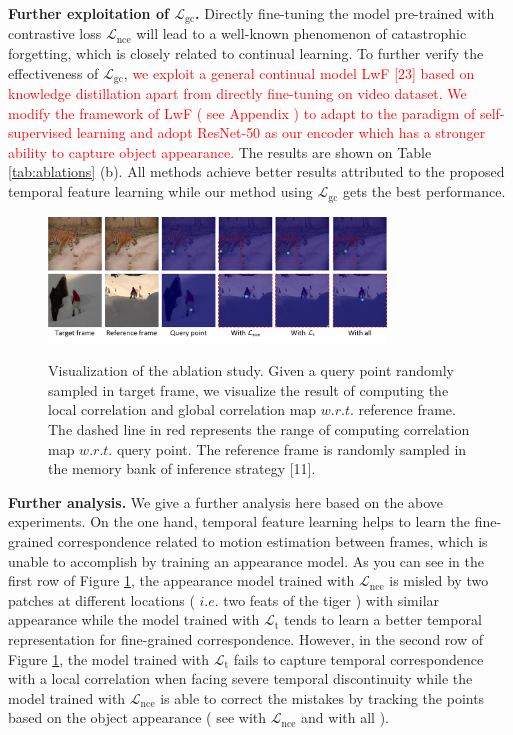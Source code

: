 \documentclass{article}
\begin{document}
\textbf{Further exploitation of $\mathcal{L}_{\mathrm{gc}}$.}  Directly fine-tuning the model pre-trained with contrastive loss $\mathcal{L}_{\mathrm{nce}}$ will lead to a well-known phenomenon of catastrophic forgetting, which is closely related to continual learning. To further verify the effectiveness of  $\mathcal{L}_{\mathrm{gc}}$,  \textcolor{red}{we exploit a general continual model LwF [23]  based on knowledge distillation apart from directly fine-tuning on video dataset. We modify the framework of LwF ( see Appendix ) to adapt to the paradigm of self-supervised learning and adopt ResNet-50 as our encoder which has a stronger ability to capture object appearance.} The results are shown on Table \ref{tab:ablations} (b). All methods achieve better results attributed to the proposed temporal feature learning while our method using $\mathcal{L}_{\mathrm{gc}}$ gets the best performance. 

\begin{figure}[!tb]
  \centering
  {\includegraphics[width=0.8\textwidth]{figure/abalations/ablataions.pdf}}
  \caption{\small Visualization of the ablation study. Given a query point randomly sampled in target frame, we visualize the result of computing the local correlation and global correlation map $w.r.t.$ reference frame. The dashed line in red represents the range of computing correlation map $w.r.t.$ query point. The reference frame is randomly sampled in the memory bank of inference strategy [11]. }
  \label{fig:ablations}
  \vspace{-7mm}
\end{figure}


\textbf{Further analysis.} 
We give a further analysis here based on the above experiments. On the one hand, temporal feature learning helps to learn the fine-grained correspondence related to motion estimation between frames, which is unable to accomplish by training an appearance model. As you can see in the first row of Figure \ref{fig:ablations}, the appearance model trained with $\mathcal{L}_{\mathrm{nce}}$ is misled by two patches at different locations ( $i.e.$ two feats of the tiger ) with similar appearance while the model trained with $\mathcal{L}_{\mathrm{t}}$ tends to learn a better temporal representation for fine-grained correspondence. However, in the second row of Figure \ref{fig:ablations}, the model trained with $\mathcal{L}_{\mathrm{t}}$ fails to capture temporal correspondence with a local correlation  when facing severe temporal discontinuity  while the model trained with $\mathcal{L}_{\mathrm{nce}}$ is able to correct the mistakes by tracking the points based on the object appearance ( see with $\mathcal{L}_{\mathrm{nce}}$ and with all ).
\end{document}
